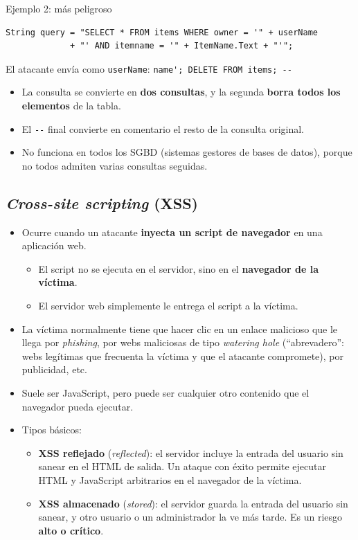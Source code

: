 \documentclass[11pt,a4paper]{report}
\begin{document}
\begin{ejemplo}{Ejemplo 2: más peligroso}
\begin{verbatim}
String query = "SELECT * FROM items WHERE owner = '" + userName
             + "' AND itemname = '" + ItemName.Text + "'";
\end{verbatim}
El atacante envía como \texttt{userName}: \verb|name'; DELETE FROM items; --|
\begin{itemize}
  \item La consulta se convierte en \textbf{dos consultas}, y la segunda \textbf{borra todos los elementos} de la tabla.
  \item El \verb|--| final convierte en comentario el resto de la consulta original.
  \item No funciona en todos los SGBD (sistemas gestores de bases de datos), porque no todos admiten varias consultas seguidas.
\end{itemize}
\end{ejemplo}
 
\subsection{\emph{Cross-site scripting} (XSS)}
 
\begin{itemize}
  \item Ocurre cuando un atacante \textbf{inyecta un script de navegador} en una aplicación web.
    \begin{itemize}
      \item El script no se ejecuta en el servidor, sino en el \textbf{navegador de la víctima}.
      \item El servidor web simplemente le entrega el script a la víctima.
    \end{itemize}
  \item La víctima normalmente tiene que hacer clic en un enlace malicioso que le llega por \emph{phishing}, por webs maliciosas de tipo \emph{watering hole} (``abrevadero'': webs legítimas que frecuenta la víctima y que el atacante compromete), por publicidad, etc.
  \item Suele ser JavaScript, pero puede ser cualquier otro contenido que el navegador pueda ejecutar.
  \item Tipos básicos:
    \begin{itemize}
      \item \textbf{XSS reflejado} (\emph{reflected}): el servidor incluye la entrada del usuario sin sanear en el HTML de salida. Un ataque con éxito permite ejecutar HTML y JavaScript arbitrarios en el navegador de la víctima.
      \item \textbf{XSS almacenado} (\emph{stored}): el servidor guarda la entrada del usuario sin sanear, y otro usuario o un administrador la ve más tarde. Es un riesgo \textbf{alto o crítico}.
    \end{itemize}
\end{itemize}
 
\end{document}
